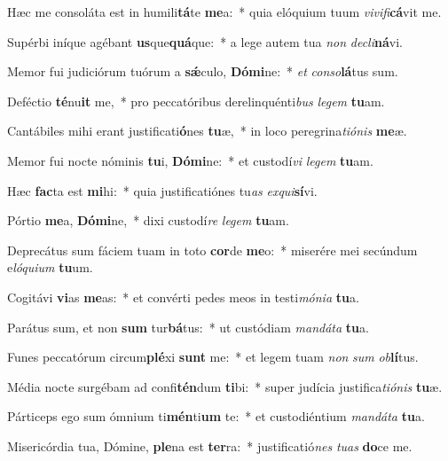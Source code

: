 \item Hæc me consoláta est in humili\textbf{tá}te \textbf{me}a:~* quia elóquium tuum \textit{vi}\textit{vi}\textit{fi}\textbf{cá}vit me.
\item Supérbi iníque agébant \textbf{us}que\textbf{quá}que:~* a lege autem tua \textit{non} \textit{de}\textit{cli}\textbf{ná}vi.
\item Memor fui judiciórum tuórum a \textbf{sǽ}culo, \textbf{Dó}\textbf{mi}ne:~* \textit{et} \textit{con}\textit{so}\textbf{lá}tus sum.
\item Deféctio \textbf{té}nu\textbf{it} me,~* pro peccatóribus derelinquénti\textit{bus} \textit{le}\textit{gem} \textbf{tu}am.
\item Cantábiles mihi erant justificati\textbf{ó}nes \textbf{tu}æ,~* in loco peregrina\textit{ti}\textit{ó}\textit{nis} \textbf{me}æ.
\item Memor fui nocte nóminis \textbf{tu}i, \textbf{Dó}\textbf{mi}ne:~* et custodí\textit{vi} \textit{le}\textit{gem} \textbf{tu}am.
\item Hæc \textbf{fac}ta est \textbf{mi}hi:~* quia justificatiónes tu\textit{as} \textit{ex}\textit{qui}\textbf{sí}vi.
\item Pórtio \textbf{me}a, \textbf{Dó}\textbf{mi}ne,~* dixi custodí\textit{re} \textit{le}\textit{gem} \textbf{tu}am.
\item Deprecátus sum fáciem tuam in toto \textbf{cor}de \textbf{me}o:~* miserére mei secúndum e\textit{ló}\textit{qui}\textit{um} \textbf{tu}um.
\item Cogitávi \textbf{vi}as \textbf{me}as:~* et convérti pedes meos in testi\textit{mó}\textit{ni}\textit{a} \textbf{tu}a.
\item Parátus sum, et non \textbf{sum} tur\textbf{bá}tus:~* ut custódiam \textit{man}\textit{dá}\textit{ta} \textbf{tu}a.
\item Funes peccatórum circum\textbf{plé}xi \textbf{sunt} me:~* et legem tuam \textit{non} \textit{sum} \textit{ob}\textbf{lí}tus.
\item Média nocte surgébam ad confi\textbf{tén}dum \textbf{ti}bi:~* super judícia justifica\textit{ti}\textit{ó}\textit{nis} \textbf{tu}æ.
\item Párticeps ego sum ómnium ti\textbf{mén}ti\textbf{um} te:~* et custodiéntium \textit{man}\textit{dá}\textit{ta} \textbf{tu}a.
\item Misericórdia tua, Dómine, \textbf{ple}na est \textbf{ter}ra:~* justificatió\textit{nes} \textit{tu}\textit{as} \textbf{do}ce me.
